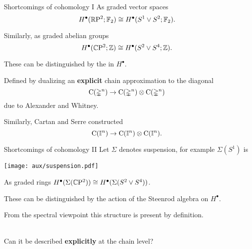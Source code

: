 
\begin{frame}{Shortcomings of cohomology I}
	\pause
	As graded vector spaces
	\[
	H^\bullet(\mathbb{R} \mathrm{P}^2; {\mathbb{F}_2}) \cong H^\bullet(S^1 \vee S^2; {\mathbb{F}_2}).
	\]

	\pause
	Similarly, as graded abelian groups
	\[
	H^\bullet(\mathbb{C} \mathrm{P}^2; \mathbb{Z}) \cong H^\bullet(S^2 \vee S^4; \mathbb{Z}).
	\]

	\pause
	These can be distinguished by the  in $H^\bullet$.

	\bigskip\pause
	Defined by dualizing an \textbf{explicit} chain approximation to the diagonal
	\[
	\operatorname{C}(\mathbb{\Delta}^n) \to \operatorname{C}(\mathbb{\Delta}^n) \otimes \operatorname{C}(\mathbb{\Delta}^n)
	\]
	due to Alexander and Whitney.

	\medskip\pause
	Similarly, Cartan and Serre constructed
	\[
	\operatorname{C}(\mathbb{I}^n) \to \operatorname{C}(\mathbb{I}^n) \otimes \operatorname{C}(\mathbb{I}^n).
	\]
\end{frame}

\begin{frame}[fragile]{Shortcomings of cohomology II}
	\pause
	Let $\Sigma$ denotes suspension, for example $\Sigma(S^1)$ is
	\begin{center}
		\texttt{[image: aux/suspension.pdf]}
		\vskip-15pt
	\end{center}

	\pause
	As graded rings $H^\bullet(\Sigma(\mathbb{C} \mathrm{P}^2)) \cong H^\bullet(\Sigma(S^2 \vee S^4))$.

	\bigskip\pause
	These can be distinguished by the action of the Steenrod algebra on $H^\bullet$.

	\bigskip\pause
	From the spectral viewpoint this structure is present by definition.

	\bigskip\pause
	 \\
	Can it be described \textbf{explicitly} at the chain level?
\end{frame}